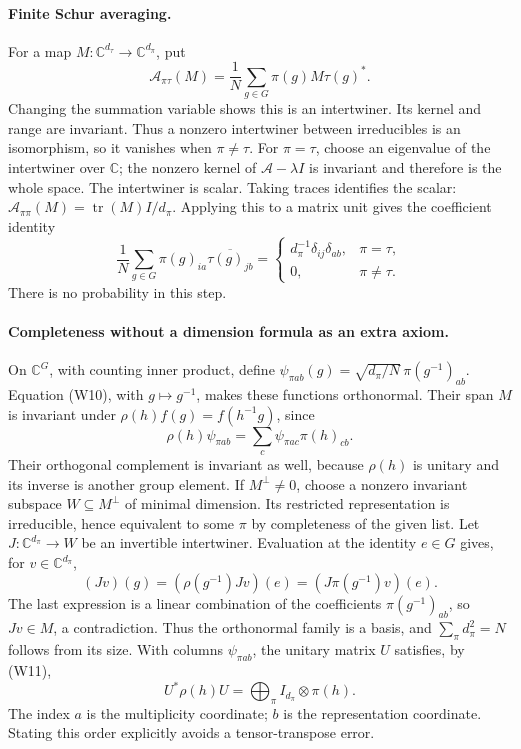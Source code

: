 \documentclass[11pt,a4paper]{article}
\newcommand{\C}{\mathbb C}
\DeclareMathOperator{\tr}{tr}
\begin{document}
\paragraph{Finite Schur averaging.}
For a map $M:\C^{d_\tau}\to\C^{d_\pi}$, put
\[
 \mathcal A_{\pi\tau}(M)=\frac1N\sum_{g\in G}\pi(g)M\tau(g)^*.
\]
Changing the summation variable shows this is an intertwiner. Its kernel
and range are invariant. Thus a nonzero intertwiner between irreducibles
is an isomorphism, so it vanishes when $\pi\ne\tau$. For $\pi=\tau$,
choose an eigenvalue of the intertwiner over $\C$; the nonzero kernel of
$\mathcal A-\lambda I$ is invariant and therefore is the whole space.
The intertwiner is scalar. Taking traces identifies the scalar:
$\mathcal A_{\pi\pi}(M)=\tr(M)I/d_\pi$.
Applying this to a matrix unit gives the coefficient identity
\[
 \frac1N\sum_{g\in G}\pi(g)_{ia}\overline{\tau(g)_{jb}}
 =\begin{cases}d_\pi^{-1}\delta_{ij}\delta_{ab},&\pi=\tau,\\
                 0,&\pi\ne\tau.\end{cases}                    \tag{W10}
\]
There is no probability in this step.

\paragraph{Completeness without a dimension formula as an extra axiom.}
On $\C^G$, with counting inner product, define
$\psi_{\pi ab}(g)=\sqrt{d_\pi/N}\,\pi(g^{-1})_{ab}$.
Equation (W10), with $g\mapsto g^{-1}$, makes these functions orthonormal.
Their span $M$ is invariant under $\rho(h)f(g)=f(h^{-1}g)$, since
\[
 \rho(h)\psi_{\pi ab}=\sum_c\psi_{\pi ac}\pi(h)_{cb}.           \tag{W11}
\]
Their orthogonal complement is invariant as well, because $\rho(h)$ is
unitary and its inverse is another group element.
If $M^\perp\ne0$, choose a nonzero invariant subspace $W\subseteq M^\perp$
of minimal dimension. Its restricted representation is irreducible, hence
equivalent to some $\pi$ by completeness of the given list. Let
$J:\C^{d_\pi}\to W$ be an invertible intertwiner. Evaluation at the
identity $e\in G$ gives, for $v\in\C^{d_\pi}$,
\[
 (Jv)(g)=(\rho(g^{-1})Jv)(e)=(J\pi(g^{-1})v)(e).
\]
The last expression is a linear combination of the coefficients
$\pi(g^{-1})_{ab}$, so $Jv\in M$, a contradiction. Thus the orthonormal
family is a basis, and $\sum_\pi d_\pi^2=N$ follows from its size.
With columns $\psi_{\pi ab}$, the unitary matrix $U$ satisfies, by (W11),
\[
 U^*\rho(h)U=\bigoplus_\pi I_{d_\pi}\otimes\pi(h).              \tag{W12}
\]
The index $a$ is the multiplicity coordinate; $b$ is the representation
coordinate. Stating this order explicitly avoids a tensor-transpose error.
\end{document}

